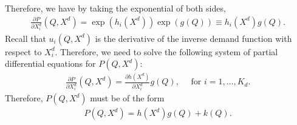 \documentclass[11pt, a4paper]{article}
\theoremstyle{remark}
\begin{document}
 

Therefore, we have by taking the exponential of both sides,
\begin{align}
    \frac{\partial P}{\partial X^{d}_i}(Q, X^{d}) = \exp(h_i(X^{d})) \exp(g(Q)) \equiv h_i(X^{d}) g(Q).
\end{align}
Recall that $u_i(Q, X^{d})$ is the derivative of the inverse demand function with respect to $X^{d}_i$.
Therefore, we need to solve the following system of partial differential equations for $P(Q, X^{d})$:
\begin{align}
    \frac{\partial P}{\partial X^{d}_i}(Q, X^{d}) = \frac{\partial h(X^{d})}{\partial X^{d}_i} g(Q), \quad \text{ for } i = 1, \ldots, K_d.
\end{align}
Therefore, $P(Q, X^{d})$ must be of the form
\begin{align}
    P(Q, X^{d}) = h(X^{d})g(Q) + k(Q).
\end{align}
\end{document}
